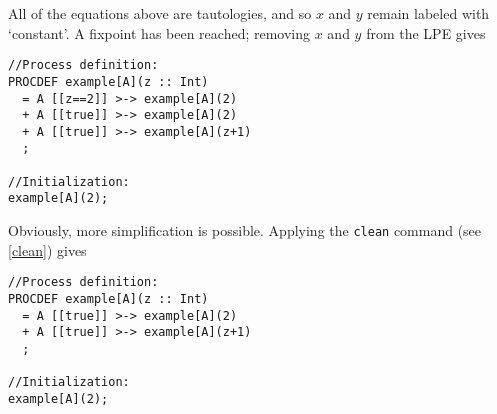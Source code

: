 All of the equations above are tautologies, and so $x$ and $y$ remain labeled with `constant'.
A fixpoint has been reached; removing $x$ and $y$ from the LPE gives

\begin{lstlisting}
//Process definition:
PROCDEF example[A](z :: Int)
  = A [[z==2]] >-> example[A](2)
  + A [[true]] >-> example[A](2)
  + A [[true]] >-> example[A](z+1)
  ;

//Initialization:
example[A](2);
\end{lstlisting}

Obviously, more simplification is possible.
Applying the \texttt{clean} command (see \ref{clean}) gives

\begin{lstlisting}
//Process definition:
PROCDEF example[A](z :: Int)
  = A [[true]] >-> example[A](2)
  + A [[true]] >-> example[A](z+1)
  ;

//Initialization:
example[A](2);
\end{lstlisting}

